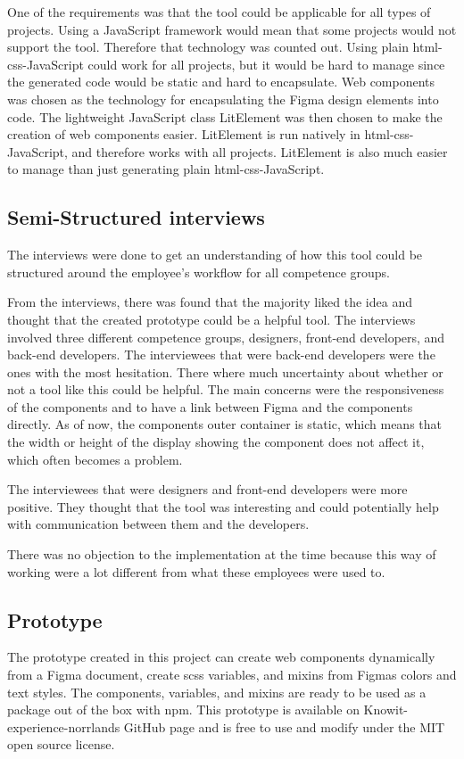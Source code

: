 One of the requirements was that the tool could be applicable for all types of projects. Using a JavaScript framework would mean that some projects would not support the tool. Therefore that technology was counted out. Using plain \acrshort{html}-\acrshort{css}-JavaScript could work for all projects, but it would be hard to manage since the generated code would be static and hard to encapsulate. Web \glspl{component} was chosen as the technology for encapsulating the Figma design elements into code. The lightweight JavaScript class LitElement was then chosen to make the creation of web components easier. LitElement is run natively in \acrshort{html}-\acrshort{css}-JavaScript, and therefore works with all projects. LitElement is also much easier to manage than just generating plain \acrshort{html}-\acrshort{css}-JavaScript.


\subsection{Semi-Structured interviews}%
\label{sub:Initial interviews}
The interviews were done to get an understanding of how this tool could be structured around the employee's workflow for all competence groups.

From the interviews, there was found that the majority liked the idea and thought that the created prototype could be a helpful tool.  The interviews involved three different competence groups, designers, front-end developers, and back-end developers. The interviewees that were back-end developers were the ones with the most hesitation. There where much uncertainty about whether or not a tool like this could be helpful. The main concerns were the responsiveness of the \glspl{component} and to have a link between Figma and the \glspl{component} directly. As of now, the \glspl{component} outer container is static, which means that the width or height of the display showing the \gls{component} does not affect it, which often becomes a problem.   

The interviewees that were designers and front-end developers were more positive. They thought that the tool was interesting and could potentially help with communication between them and the developers.

There was no objection to the implementation at the time because this way of working were a lot different from what these employees were used to.  

\subsection{Prototype}%
\label{sub:Prototype}
The prototype created in this project can create web components dynamically from a Figma document, create \acrshort{scss} variables, and \glspl{mixin} from Figmas colors and text styles. The components, variables, and \glspl{mixin} are ready to be used as a package out of the box with \acrshort{npm}. This prototype is available on Knowit-experience-norrlands GitHub page and is free to use and modify under the MIT open source license. 

